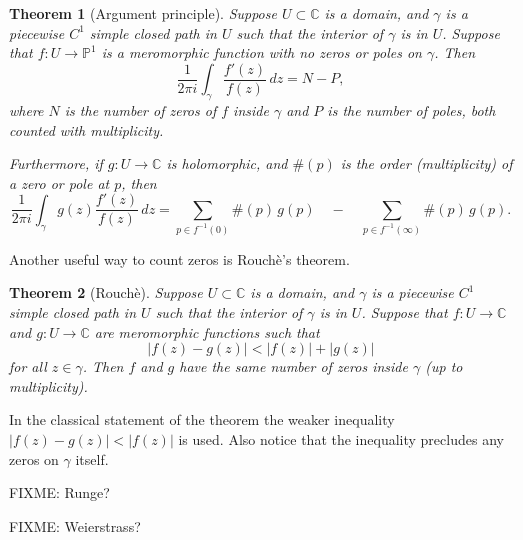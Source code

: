 \documentclass[12pt,openany]{book}
\newcommand{\sabs}[1]{\lvert {#1} \rvert}
\newcommand{\C}{{\mathbb{C}}}
\newcommand{\bP}{{\mathbb{P}}}
\theoremstyle{plain}
\newtheorem{thm}{Theorem}[section]
\theoremstyle{remark}
\theoremstyle{definition}
\theoremstyle{exercise}
\theoremstyle{example}
\begin{document}
\begin{thm}[Argument principle]
Suppose $U \subset \C$ is a domain, and $\gamma$ is a piecewise $C^1$
simple closed path in $U$ such that the interior of $\gamma$ is in $U$.
Suppose that $f \colon U \to \bP^1$ is a meromorphic function with no zeros
or poles on $\gamma$.
Then
\begin{equation*}
\frac{1}{2\pi i}
\int_\gamma \frac{f'(z)}{f(z)} \, dz
= N - P ,
\end{equation*}
where $N$ is the number of zeros of $f$ inside $\gamma$ and $P$ is the
number of poles, both counted with multiplicity.

Furthermore, if $g \colon U \to \C$ is holomorphic, and $\#(p)$ is the order
(multiplicity) of a zero or pole at $p$, then
\begin{equation*}
\frac{1}{2\pi i}
\int_\gamma g(z) \frac{f'(z)}{f(z)} \, dz
=
\sum_{p \in f^{-1}(0)}
\#(p) \, g(p)
\quad
-
\quad
\sum_{p \in f^{-1}(\infty)}
\#(p) \, g(p) .
\end{equation*}
\end{thm}

Another useful way to count zeros is Rouch\`e's theorem.

\begin{thm}[Rouch\`e]
Suppose $U \subset \C$ is a domain, and $\gamma$ is a piecewise $C^1$
simple closed path in $U$ such that the interior of $\gamma$ is in $U$.
Suppose that $f \colon U \to \C$ and $g \colon U \to \C$
are meromorphic functions such that
\begin{equation*}
\sabs{f(z)-g(z)} < \sabs{f(z)}+\sabs{g(z)}
\end{equation*}
for all $z \in \gamma$.  Then $f$ and $g$
have the same number of zeros
inside $\gamma$ (up to multiplicity).
\end{thm}

In the classical statement of the theorem the weaker
inequality $\sabs{f(z)-g(z)} < \sabs{f(z)}$ is used.
Also notice that the inequality precludes any zeros on $\gamma$ itself.

FIXME: Runge?

FIXME: Weierstrass?



\def\myDOI#1{\href{http://dx.doi.org/#1}{#1}}
\end{document}

